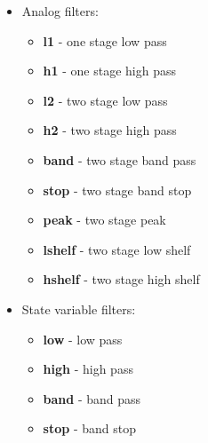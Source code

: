    \begin{itemize}
      \item Analog filters:
      \begin{itemize}
          \item \textbf{l1} - one stage low pass
          \item \textbf{h1} - one stage high pass
          \item \textbf{l2} - two stage low pass
          \item \textbf{h2} - two stage high pass
          \item \textbf{band} - two stage band pass
          \item \textbf{stop} - two stage band stop
          \item \textbf{peak} - two stage peak
          \item \textbf{lshelf} - two stage low shelf
          \item \textbf{hshelf} - two stage high shelf
      \end{itemize}
      \item State variable filters:
      \begin{itemize}
         \item \textbf{low} - low pass
         \item \textbf{high} - high pass
         \item \textbf{band} - band pass
         \item \textbf{stop} - band stop
      \end{itemize}
   \end{itemize}

